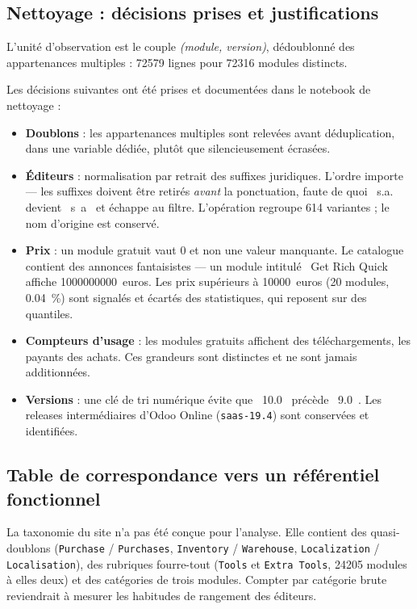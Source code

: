 \documentclass[11pt,a4paper]{article}
\begin{document}
\subsection{Nettoyage : décisions prises et justifications}

L'unité d'observation est le couple \emph{(module, version)}, dédoublonné des
appartenances multiples : \num{72579} lignes pour \num{72316} modules distincts.

Les décisions suivantes ont été prises et documentées dans le notebook de
nettoyage :

\begin{itemize}
  \item \textbf{Doublons} : les appartenances multiples sont relevées avant
  déduplication, dans une variable dédiée, plutôt que silencieusement écrasées.
  \item \textbf{Éditeurs} : normalisation par retrait des suffixes juridiques.
  L'ordre importe --- les suffixes doivent être retirés \emph{avant} la
  ponctuation, faute de quoi \guillemotleft~s.a.~\guillemotright{} devient
  \guillemotleft~s~a~\guillemotright{} et échappe au filtre. L'opération
  regroupe \num{614} variantes ; le nom d'origine est conservé.
  \item \textbf{Prix} : un module gratuit vaut \num{0} et non une valeur
  manquante. Le catalogue contient des annonces fantaisistes --- un module
  intitulé \guillemotleft~Get Rich Quick~\guillemotright{} affiche
  \num{1000000000}~euros. Les prix supérieurs à \num{10000}~euros
  (\num{20} modules, \SI{0.04}{\percent}) sont signalés et écartés des
  statistiques, qui reposent sur des quantiles.
  \item \textbf{Compteurs d'usage} : les modules gratuits affichent des
  téléchargements, les payants des achats. Ces grandeurs sont distinctes et ne
  sont jamais additionnées.
  \item \textbf{Versions} : une clé de tri numérique évite que
  \guillemotleft~10.0~\guillemotright{} précède
  \guillemotleft~9.0~\guillemotright{}. Les releases intermédiaires d'Odoo
  Online (\texttt{saas-19.4}) sont conservées et identifiées.
\end{itemize}

\subsection{Table de correspondance vers un référentiel fonctionnel}

La taxonomie du site n'a pas été conçue pour l'analyse. Elle contient des
quasi-doublons (\texttt{Purchase} / \texttt{Purchases}, \texttt{Inventory} /
\texttt{Warehouse}, \texttt{Localization} / \texttt{Localisation}), des
rubriques fourre-tout (\texttt{Tools} et \texttt{Extra Tools}, \num{24205}
modules à elles deux) et des catégories de trois modules. Compter par catégorie
brute reviendrait à mesurer les habitudes de rangement des éditeurs.
\end{document}
